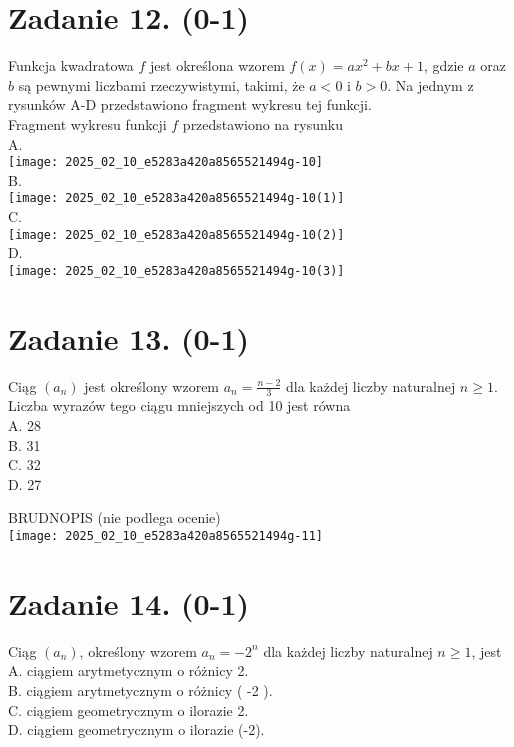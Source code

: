 \documentclass[10pt]{article}
\begin{document}
\section*{Zadanie 12. (0-1)}
Funkcja kwadratowa \(f\) jest określona wzorem \(f(x)=a x^{2}+b x+1\), gdzie \(a\) oraz \(b\) są pewnymi liczbami rzeczywistymi, takimi, że \(a<0\) i \(b>0\). Na jednym z rysunków A-D przedstawiono fragment wykresu tej funkcji.\\
Fragment wykresu funkcji \(f\) przedstawiono na rysunku\\
A.\\
\texttt{[image: 2025\_02\_10\_e5283a420a8565521494g-10]}\\
B.\\
\texttt{[image: 2025\_02\_10\_e5283a420a8565521494g-10(1)]}\\
C.\\
\texttt{[image: 2025\_02\_10\_e5283a420a8565521494g-10(2)]}\\
D.\\
\texttt{[image: 2025\_02\_10\_e5283a420a8565521494g-10(3)]}

\section*{Zadanie 13. (0-1)}
Ciąg \(\left(a_{n}\right)\) jest określony wzorem \(a_{n}=\frac{n-2}{3}\) dla każdej liczby naturalnej \(n \geq 1\).\\
Liczba wyrazów tego ciągu mniejszych od 10 jest równa\\
A. 28\\
B. 31\\
C. 32\\
D. 27

BRUDNOPIS (nie podlega ocenie)\\
\texttt{[image: 2025\_02\_10\_e5283a420a8565521494g-11]}

\section*{Zadanie 14. (0-1)}
Ciąg \(\left(a_{n}\right)\), określony wzorem \(a_{n}=-2^{n}\) dla każdej liczby naturalnej \(n \geq 1\), jest\\
A. ciągiem arytmetycznym o różnicy 2.\\
B. ciągiem arytmetycznym o różnicy ( -2 ).\\
C. ciągiem geometrycznym o ilorazie 2.\\
D. ciągiem geometrycznym o ilorazie (-2).
\end{document}
